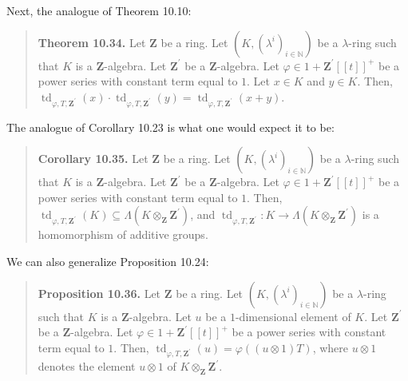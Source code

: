 \documentclass[numbers=enddot,12pt,final,onecolumn,notitlepage]{scrartcl}%
\begin{document}
Next, the analogue of Theorem 10.10:

\begin{quote}
\textbf{Theorem 10.34.} Let $\mathbf{Z}$ be a ring. Let $\left(  K,\left(
\lambda^{i}\right)  _{i\in\mathbb{N}}\right)  $ be a $\lambda$-ring such that
$K$ is a $\mathbf{Z}$-algebra. Let $\mathbf{Z}^{\prime}$ be a $\mathbf{Z}%
$-algebra. Let $\varphi\in1+\mathbf{Z}^{\prime}\left[  \left[  t\right]
\right]  ^{+}$ be a power series with constant term equal to $1$. Let $x\in K$
and $y\in K$. Then, $\operatorname*{td}\nolimits_{\varphi,T,\mathbf{Z}%
^{\prime}}\left(  x\right)  \cdot\operatorname*{td}\nolimits_{\varphi
,T,\mathbf{Z}^{\prime}}\left(  y\right)  =\operatorname*{td}\nolimits_{\varphi
,T,\mathbf{Z}^{\prime}}\left(  x+y\right)  $.
\end{quote}

The analogue of Corollary 10.23 is what one would expect it to be:

\begin{quote}
\textbf{Corollary 10.35.} Let $\mathbf{Z}$ be a ring. Let $\left(  K,\left(
\lambda^{i}\right)  _{i\in\mathbb{N}}\right)  $ be a $\lambda$-ring such that
$K$ is a $\mathbf{Z}$-algebra. Let $\mathbf{Z}^{\prime}$ be a $\mathbf{Z}%
$-algebra. Let $\varphi\in1+\mathbf{Z}^{\prime}\left[  \left[  t\right]
\right]  ^{+}$ be a power series with constant term equal to $1$. Then,
$\operatorname*{td}_{\varphi,T,\mathbf{Z}^{\prime}}\left(  K\right)
\subseteq\Lambda\left(  K\otimes_{\mathbf{Z}}\mathbf{Z}^{\prime}\right)  $,
and $\operatorname*{td}_{\varphi,T,\mathbf{Z}^{\prime}}:K\rightarrow
\Lambda\left(  K\otimes_{\mathbf{Z}}\mathbf{Z}^{\prime}\right)  $ is a
homomorphism of additive groups.
\end{quote}

We can also generalize Proposition 10.24:

\begin{quote}
\textbf{Proposition 10.36.} Let $\mathbf{Z}$ be a ring. Let $\left(  K,\left(
\lambda^{i}\right)  _{i\in\mathbb{N}}\right)  $ be a $\lambda$-ring such that
$K$ is a $\mathbf{Z}$-algebra. Let $u$ be a $1$-dimensional element of $K$.
Let $\mathbf{Z}^{\prime}$ be a $\mathbf{Z}$-algebra. Let $\varphi
\in1+\mathbf{Z}^{\prime}\left[  \left[  t\right]  \right]  ^{+}$ be a power
series with constant term equal to $1$. Then, $\operatorname*{td}%
\nolimits_{\varphi,T,\mathbf{Z}^{\prime}}\left(  u\right)  =\varphi\left(
\left(  u\otimes1\right)  T\right)  $, where $u\otimes1$ denotes the element
$u\otimes1$ of $K\otimes_{\mathbf{Z}}\mathbf{Z}^{\prime}$.
\end{quote}
\end{document}
